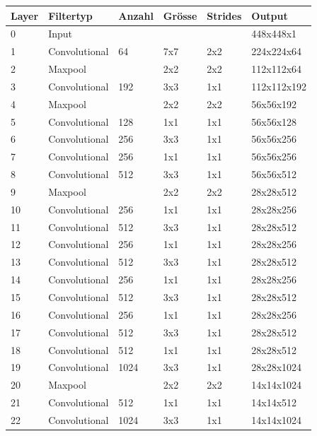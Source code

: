 \begin{table}
\centering
\begin{tabularx}{1.1\textwidth}{|l|l|l|l|l|X|}
\hline
\textbf{Layer} & \textbf{Filtertyp}  & \textbf{Anzahl} & \textbf{Grösse} & \textbf{Strides} & \textbf{Output} \\
\hline 	0	& Input				&		&		&		& 448x448x1\\
\hline 	1	& Convolutional		& 64		& 7x7	& 2x2	& 224x224x64	\\
\hline 	2	& Maxpool      		& 		& 2x2	& 2x2	& 112x112x64	\\
\hline 	3   & Convolutional		& 192	& 3x3	& 1x1	& 112x112x192\\
\hline 	4	& Maxpool			& 		& 2x2	& 2x2	& 56x56x192	\\
\hline 	5	& Convolutional		& 128	& 1x1	& 1x1	& 56x56x128	\\
\hline 	6	& Convolutional		& 256	& 3x3	& 1x1	& 56x56x256	\\
\hline 	7	& Convolutional		& 256	& 1x1	& 1x1	& 56x56x256	\\
\hline 	8	& Convolutional		& 512	& 3x3	& 1x1	& 56x56x512	\\
\hline 	9	& Maxpool			&		& 2x2	& 2x2	& 28x28x512	\\
\hline 	10	& Convolutional		& 256	& 1x1	& 1x1	& 28x28x256	\\
\hline 	11	& Convolutional		& 512	& 3x3	& 1x1	& 28x28x512	\\
\hline 	12	& Convolutional		& 256	& 1x1	& 1x1	& 28x28x256	\\
\hline 	13	& Convolutional		& 512	& 3x3	& 1x1	& 28x28x512	\\
\hline 	14	& Convolutional		& 256	& 1x1	& 1x1	& 28x28x256	\\
\hline 	15	& Convolutional		& 512	& 3x3	& 1x1	& 28x28x512	\\
\hline  	16	& Convolutional		& 256	& 1x1	& 1x1	& 28x28x256	\\
\hline  	17	& Convolutional		& 512	& 3x3	& 1x1	& 28x28x512	\\
\hline 	18	& Convolutional		& 512	& 1x1	& 1x1	& 28x28x512	\\
\hline  	19	& Convolutional		& 1024	& 3x3	& 1x1	& 28x28x1024	\\
\hline  	20	& Maxpool			&		& 2x2	& 2x2	& 14x14x1024	\\
\hline  	21	& Convolutional		& 512	& 1x1	& 1x1	& 14x14x512	\\
\hline  	22	& Convolutional		& 1024	& 3x3	& 1x1	& 14x14x1024	\\

\end{tabularx}
\end{table}
